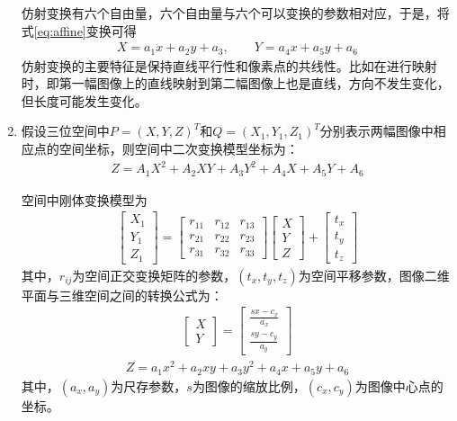 \begin{enumerate}
仿射变换有六个自由量，六个自由量与六个可以变换的参数相对应，于是，将式\ref{eq:affine}变换可得
\begin{align}
X = a_1x + a_2y + a_3, 
\qquad
Y = a_4x + a_5y + a_6
\end{align}
仿射变换的主要特征是保持直线平行性和像素点的共线性。比如在进行映射时，即第一幅图像上的直线映射到第二幅图像上也是直线，方向不发生变化，但长度可能发生变化。
\item 假设三位空间中$P=(X, Y, Z)^T$和$Q=(X_1,Y_1,Z_1)^T$分别表示两幅图像中相应点的空间坐标，则空间中二次变换模型坐标为：
\begin{align}
Z = A_1X^2 + A_2XY + A_3Y^2 + A_4X + A_5Y + A_6
\label{eq:twice-4}
\end{align}

空间中刚体变换模型为
\begin{align}
\left[ \begin{array}{c}
X_1\\
Y_1\\
Z_1
\end{array} \right]
=
\left[ \begin{array}{ccc}
r_{11} & r_{12} & r_{13} \\
r_{21} & r_{22} & r_{23} \\
r_{31} & r_{32} & r_{33}
\end{array} \right]
\left[ \begin{array}{c}
X \\
Y \\
Z
\end{array} \right]
+
\left[ \begin{array}{c}
t_x \\
t_y \\
t_z
\end{array} \right]
\label{eq:twice-1}
\end{align}
其中，$r_{ij}$为空间正交变换矩阵的参数，$(t_x, t_y, t_z)$为空间平移参数，图像二维平面与三维空间之间的转换公式为：
\begin{align}
\left[ \begin{array}{c}
X \\
Y 
\end{array} \right]
=
\left[ \begin{array}{c}
\frac{sx-c_x}{a_x} \\
\frac{sy-c_y}{a_y}
\end{array} \right]
\label{eq:twice-2}
\end{align}
\begin{align}
Z = a_1x^2 + a_2xy + a_3y^2 + a_4x + a_5y + a_6
\label{eq:twice-3}
\end{align}
其中，$(a_x, a_y)$为尺存参数，$s$为图像的缩放比例，$(c_x, c_y)$为图像中心点的坐标。


\end{enumerate}
